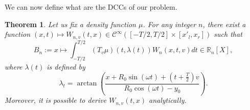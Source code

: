 \documentclass[a4paper]{article}
\numberwithin{equation}{section}
\newcommand{\RnX}{\mathbb{R}_n[X]}
\newcommand{\Cinf}{\mathcal{C}^{\infty}}
\newtheorem{theorem}{Theorem}
\begin{document}
We can now define what are the DCCs of our problem.
\begin{theorem}
Let us fix a density function $\mu$. For any integer $n$, there exist a function $(x,t)\mapsto W_{n,v}(t,x) \in \Cinf \left( [-T/2,T/2] \times [x'_l,x_r] \right)$ such that
\begin{equation}
	B_n := x \mapsto \int_{-T/2}^{T/2} \left( T_v \mu \right)\left( t,\lambda(t) \right) W_n(x,t,v) dt \in \RnX,
\label{eq:DCC}
\end{equation}
where $\lambda(t)$ is defined by
\begin{equation}
	\lambda_t = \arctan \left( \frac{x + R_0 \sin(\omega t) + \left( t + \frac{T}{2} \right)v}{R_0 \cos(\omega t) - y_0} \right).
\end{equation}
Moreover, it is possible to derive $W_{n,v}(t,x)$ analytically.
\end{theorem}
\end{document}
